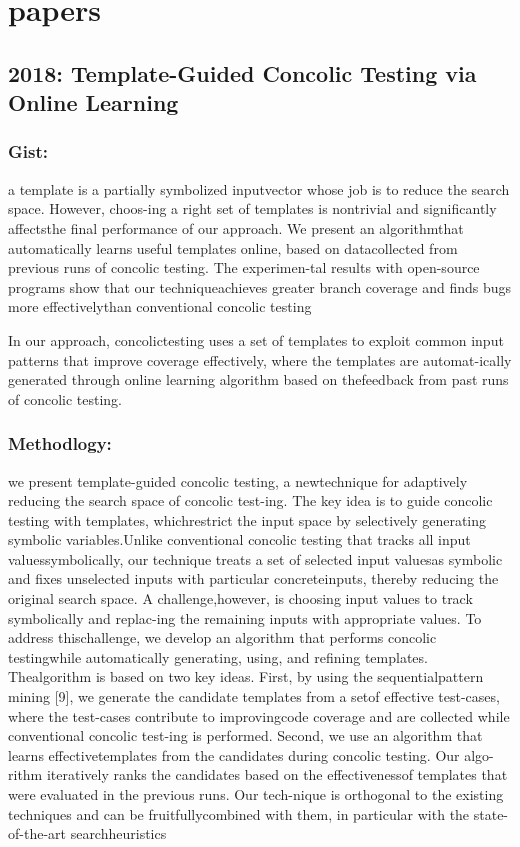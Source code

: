 \documentclass[	runningheads,
				a4paper]{llncs}
\begin{document}
\section{papers}






\subsection{2018: Template-Guided Concolic Testing via Online Learning}
\subsubsection{Gist:}
a template is a partially symbolized inputvector whose job is to reduce the search space. However, choos-ing a right set of templates is nontrivial and significantly affectsthe final performance of our approach. We present an algorithmthat automatically learns useful templates online, based on datacollected from previous runs of concolic testing. The experimen-tal results with open-source programs show that our techniqueachieves greater branch coverage and finds bugs more effectivelythan conventional concolic testing

In our approach, concolictesting uses a set of templates to exploit common input patterns that improve coverage effectively, where the templates are automat-ically generated through online learning algorithm based on thefeedback from past runs of concolic testing.

\subsubsection{Methodlogy:}
we present template-guided concolic testing, a newtechnique for adaptively reducing the search space of concolic test-ing. The key idea is to guide concolic testing with templates, whichrestrict the input space by selectively generating symbolic variables.Unlike conventional concolic testing that tracks all input valuessymbolically, our technique treats a set of selected input valuesas symbolic and fixes unselected inputs with particular concreteinputs, thereby reducing the original search space. A challenge,however, is choosing input values to track symbolically and replac-ing the remaining inputs with appropriate values. To address thischallenge, we develop an algorithm that performs concolic testingwhile automatically generating, using, and refining templates. Thealgorithm is based on two key ideas. First, by using the sequentialpattern mining [9], we generate the candidate templates from a setof effective test-cases, where the test-cases contribute to improvingcode coverage and are collected while conventional concolic test-ing is performed. Second, we use an algorithm that learns effectivetemplates from the candidates during concolic testing. Our algo-rithm iteratively ranks the candidates based on the effectivenessof templates that were evaluated in the previous runs. Our tech-nique is orthogonal to the existing techniques and can be fruitfullycombined with them, in particular with the state-of-the-art searchheuristics
\end{document}
